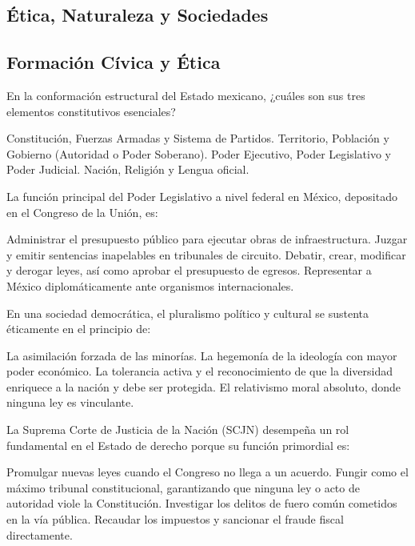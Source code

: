 \documentclass[12pt]{evaluasep}
\begin{document}
\begin{questions}
\section{Ética, Naturaleza y Sociedades}
    \subsection{Formación Cívica y Ética}

\question En la conformación estructural del Estado mexicano, ¿cuáles son sus tres elementos constitutivos esenciales?
    \begin{choices}
        \choice Constitución, Fuerzas Armadas y Sistema de Partidos.
        \CorrectChoice Territorio, Población y Gobierno (Autoridad o Poder Soberano).
        \choice Poder Ejecutivo, Poder Legislativo y Poder Judicial.
        \choice Nación, Religión y Lengua oficial.
    \end{choices}

    \question La función principal del Poder Legislativo a nivel federal en México, depositado en el Congreso de la Unión, es:
    \begin{choices}
        \choice Administrar el presupuesto público para ejecutar obras de infraestructura.
        \choice Juzgar y emitir sentencias inapelables en tribunales de circuito.
        \CorrectChoice Debatir, crear, modificar y derogar leyes, así como aprobar el presupuesto de egresos.
        \choice Representar a México diplomáticamente ante organismos internacionales.
    \end{choices}

        \newpage

    \question En una sociedad democrática, el pluralismo político y cultural se sustenta éticamente en el principio de:
    \begin{choices}
        \choice La asimilación forzada de las minorías.
        \choice La hegemonía de la ideología con mayor poder económico.
        \CorrectChoice La tolerancia activa y el reconocimiento de que la diversidad enriquece a la nación y debe ser protegida.
        \choice El relativismo moral absoluto, donde ninguna ley es vinculante.
    \end{choices}

    \question La Suprema Corte de Justicia de la Nación (SCJN) desempeña un rol fundamental en el Estado de derecho porque su función primordial es:
    \begin{choices}
        \choice Promulgar nuevas leyes cuando el Congreso no llega a un acuerdo.
        \CorrectChoice Fungir como el máximo tribunal constitucional, garantizando que ninguna ley o acto de autoridad viole la Constitución.
        \choice Investigar los delitos de fuero común cometidos en la vía pública.
        \choice Recaudar los impuestos y sancionar el fraude fiscal directamente.
    \end{choices}


\end{questions}
\end{document}
